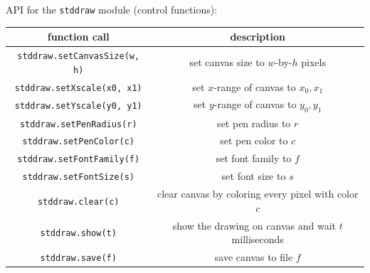\documentclass[8pt,a4paper,compress,handout]{beamer}
\begin{document}
\begin{frame}[fragile]
API for the \lstinline{stddraw} module (control functions):
\begin{center}
\begin{tabular}{cc}
function call & description \\ \hline
\lstinline$stddraw.setCanvasSize(w, h)$ & set canvas size to $w$-by-$h$ pixels \\
\lstinline$stddraw.setXscale(x0, x1)$ & set $x$-range of canvas to $x_0, x_1$ \\
\lstinline$stddraw.setYscale(y0, y1)$ & set $y$-range of canvas to $y_0, y_1$ \\
\lstinline$stddraw.setPenRadius(r)$ & set pen radius to $r$ \\
\lstinline$stddraw.setPenColor(c)$ & set pen color to $c$ \\
\lstinline$stddraw.setFontFamily(f)$ & set font family to $f$ \\
\lstinline$stddraw.setFontSize(s)$ & set font size to $s$ \\
\lstinline$stddraw.clear(c)$ & clear canvas by coloring every pixel with color $c$ \\
\lstinline$stddraw.show(t)$ & show the drawing on canvas and wait $t$ milliseconds \\
\lstinline$stddraw.save(f)$ & save canvas to file $f$ 
\end{tabular} 
\end{center}

\end{frame}
\end{document}

